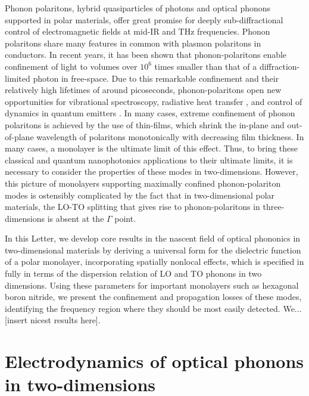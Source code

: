 \documentclass[aps,prb,twocolumn,
	groupedaddress,superscriptaddress,
	amsfonts,amssymb,amsmath,floatfix,
	citeautoscript]{revtex4-1}
\begin{document}
Phonon polaritons, hybrid quasiparticles of photons and optical phonons supported in polar materials, offer great promise for deeply sub-diffractional control of electromagnetic fields at mid-IR and THz frequencies. Phonon polaritons share many features in common with plasmon polaritons in conductors. In recent years, it has been shown that phonon-polaritons enable confinement of light to volumes over $10^6$ times smaller than that of a diffraction-limited photon in free-space\cite{caldwell2013low,xu2014mid,caldwell2014sub,dai2014tunable,tomadin2015accessing,yoxall2015direct,li2015hyperbolic,dai2015subdiffractional,dai2015graphene,caldwell2015low,li2016reversible,Basov:2016,basov2017towards,low2017polaritons,giles2017ultra}. Due to this remarkable confinement and their relatively high lifetimes of around picoseconds, phonon-polaritons open new opportunities for vibrational spectroscopy, radiative heat transfer \cite{hillenbrand2002phonon}, and control of dynamics in quantum emitters \cite{kumar2015tunable,rivera2017making,kurman2018control}. In many cases, extreme confinement of phonon polaritons is achieved by the use of thin-films, which shrink the in-plane and out-of-plane wavelength of polaritons monotonically with decreasing film thickness. In many cases, a monolayer is the ultimate limit of this effect. Thus, to bring these classical and quantum nanophotonics applications to their ultimate limits, it is necessary to consider the properties of these modes in two-dimensions. However, this picture of monolayers supporting maximally confined phonon-polariton modes is ostensibly complicated by the fact that in two-dimensional polar materials, the LO-TO splitting that gives rise to phonon-polaritons in three-dimensions is absent at the $\Gamma$ point.

In this Letter, we develop core results in the nascent field of optical phononics in two-dimensional materials by deriving a universal form for the dielectric function of a polar monolayer, incorporating spatially nonlocal effects, which is specified in fully in terms of the dispersion relation of LO and TO phonons in two dimensions. Using these parameters for important monolayers such as hexagonal boron nitride, we present the confinement and propagation losses of these modes, identifying the frequency region where they should be most easily detected. We... [insert nicest results here].

\section{Electrodynamics of optical phonons in two-dimensions}
\end{document}

